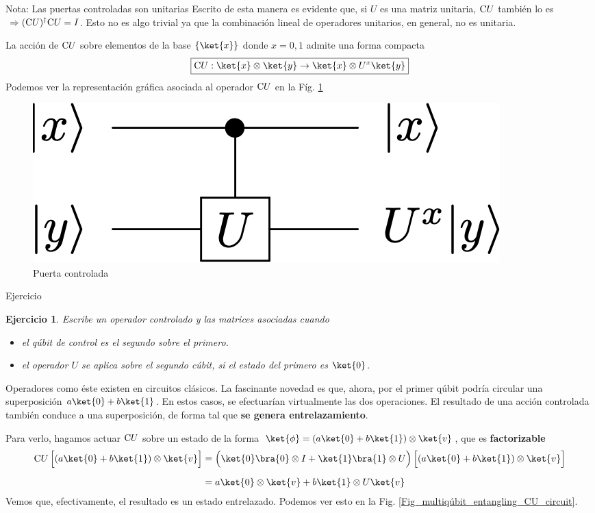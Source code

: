 \documentclass[a4paper,11pt]{book} %
\newtheorem{ejercicio_contador}{Ejercicio}
\newcommand{\Ejercicio}[1]{
		\begin{mybox_gray}{Ejercicio} 
			\begin{ejercicio_contador}
				 #1 
			\end{ejercicio_contador} 
		\end{mybox_gray}
	}
\numberwithin{equation}{chapter}
\def\Lc{\Bigl[}
\def\Rc{\Bigr]}
\newcommand{\cg}[1]{{\rm C}#1}
\begin{document}
	\begin{mybox_blue}{Nota: Las puertas controladas son unitarias}
	Escrito de esta manera es evidente que, si $U$ es una matriz unitaria, $\cg{U}$ también lo es 
	$~\Rightarrow (\cg{U})^\dagger \cg{U} = I$. Esto no es algo trivial ya que la combinación lineal de operadores 
	unitarios, en general, no es  unitaria.
	\end{mybox_blue}

La acción de $\cg{U}$ sobre elementos de la base $\{\ket{x}\}$ donde $x=0,1$ admite una forma compacta 
	\begin{equation}
	\boxed{\cg{U}:\ket{x}\otimes\ket{y}  \rightarrow \ket{x} \otimes U^x\ket{y}}
	\end{equation}
Podemos ver la representación gráfica asociada al operador $\cg{U}$ en la Fíg. \ref{Fig_multiqubit_cU_gate}

	\begin{figure}[H]
	\centering 
	\includegraphics[width=0.25\linewidth]{Figuras/Fig_multiqubit_cU_gate}
	\caption{Puerta controlada}
	\label{Fig_multiqubit_cU_gate}
	\end{figure}
	
	\Ejercicio{Escribe un operador controlado y las matrices asociadas cuando  \begin{itemize}
		\item el qúbit de control es el segundo sobre el primero.
		\item el operador $U$ se aplica sobre el segundo cúbit, si el estado del primero es $\ket{0}$. \end{itemize}}



Operadores como éste existen en circuitos clásicos. La fascinante novedad es que, ahora, por el primer qúbit podría circular una superposición $a\ket{0} + b\ket{1}$. En estos casos, se efectuarían virtualmente las dos operaciones. El resultado de una acción controlada también conduce a una superposición, de forma tal que \textbf{se genera entrelazamiento}. 

Para verlo, hagamos actuar $\cg{U}$ sobre un estado de la forma  $\ket{\phi} = (a\ket{0} + b\ket{1})\otimes \ket{v}$, que es \textbf{factorizable}
	\begin{align*}
	\cg{U}\,\Lc (a\ket{0} +b \ket{1})\otimes \ket{v} \Rc
	& = \left(\ket{0}\bra{0}\otimes I + \ket{1}\bra{1}\otimes U\rule{0mm}{4mm}\right) \Lc (a\ket{0} +b \ket{1})\otimes \ket{v} \Rc \\ \rule{0mm}{5mm} 
    & = a\ket{0}\otimes \ket{v} + b\ket{1}\otimes U\ket{v}
	\end{align*}
Vemos que, efectivamente, el resultado es un estado entrelazado. Podemos ver esto en la Fig. \ref{Fig_multiqúbit_entangling_CU_circuit}.
\end{document}
